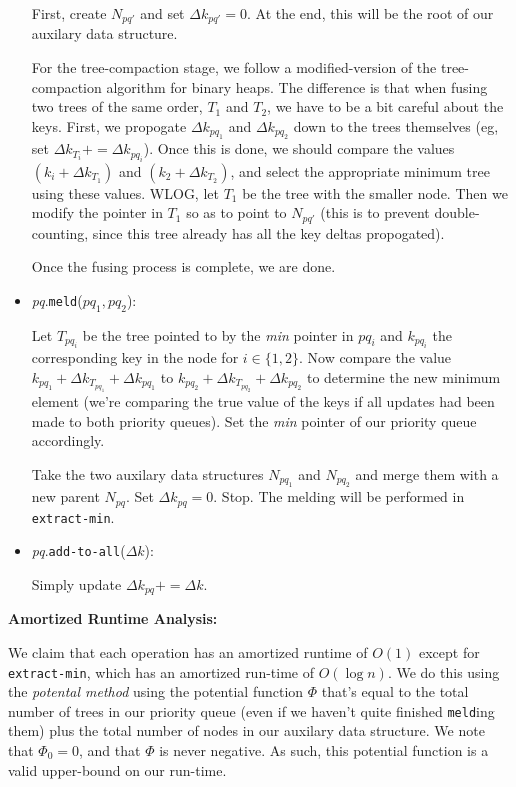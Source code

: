 \documentclass[12pt]{exam}
\newcommand*{\bigo}[1]{O \left( #1 \right)}
\begin{document}
\begin{questions}
\begin{solution}
\begin{itemize}
    First, create $N_{pq'}$ and set $\Delta k_{pq'} = 0$. At the end, this will be the root of our auxilary data structure.


    For the tree-compaction stage, we follow a modified-version of the tree-compaction algorithm for binary heaps. The difference is that when fusing two trees of the same order, $T_1$ and $T_2$, we have to be a bit careful about the keys. First, we propogate $\Delta k_{pq_1}$ and $\Delta k_{pq_2}$ down to the trees themselves (eg, set $\Delta k_{T_i} += \Delta k_{pq_i}$). Once this is done, we should compare the values $(k_i + \Delta k_{T_1})$ and $(k_2 + \Delta k_{T_2})$, and select the appropriate minimum tree using these values. WLOG, let $T_1$ be the tree with the smaller node. Then we modify the pointer in $T_1$ so as to point to $N_{pq'}$ (this is to prevent double-counting, since this tree already has all the key deltas propogated).


    Once the fusing process is complete, we are done.

  \item \textit{pq}.\texttt{meld}($pq_1, pq_2$):

    Let $T_{pq_i}$ be the tree pointed to by the \textit{min} pointer in $pq_i$ and $k_{pq_i}$ the corresponding key in the node for $i \in \{1,2\}$. Now compare the value $k_{pq_1} + \Delta k_{T_{pq_1}} + \Delta k_{pq_1}$ to $k_{pq_2} + \Delta k_{T_{pq_2}} + \Delta k_{pq_2}$ to determine the new minimum element (we're comparing the true value of the keys if all updates had been made to both priority queues). Set the \textit{min} pointer of our priority queue accordingly.

    Take the two auxilary data structures $N_{pq_1}$ and $N_{pq_2}$ and merge them with a new parent $N_{pq}$. Set $\Delta k_{pq} = 0$. Stop. The melding will be performed in \texttt{extract-min}.

  \item \textit{pq}.\texttt{add-to-all}($\Delta k$):

    Simply update $\Delta k_{pq} += \Delta k$. 
\end{itemize}

\textbf{Amortized Runtime Analysis:}

We claim that each operation has an amortized runtime of $\bigo{1}$ except for \texttt{extract-min}, which has an amortized run-time of $\bigo{ \log n}$. We do this using the \textit{potental method} using the potential function $\Phi$ that's equal to the total number of trees in our priority queue (even if we haven't quite finished \texttt{meld}ing them) plus the total number of nodes in our auxilary data structure. We note that $\Phi_0 = 0$, and that $\Phi$ is never negative. As such, this potential function is a valid upper-bound on our run-time.


\end{solution}
\end{questions}
\end{document}
